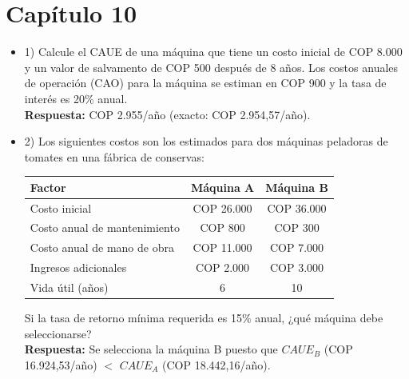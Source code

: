 

\chapter*{Capítulo 10}

\begin{itemize}

 \item 1) Calcule el CAUE de una máquina que tiene un costo inicial de COP 8.000 y un valor de salvamento de COP 500 después de 8 años. Los costos anuales de operación (CAO) para la máquina se estiman en COP 900 y la tasa de interés es 20\% anual.\\
       \textbf{Respuesta:} COP 2.955/año (exacto: COP 2.954,57/año).
       \medskip

 \item 2) Los siguientes costos son los estimados para dos máquinas peladoras de tomates en una fábrica de conservas:

       \begin{center}
        \renewcommand{\arraystretch}{1.2}
        \begin{tabular}{|l|c|c|}
         \hline
         \rowcolor[HTML]{FFB183}
         \textbf{Factor} & \textbf{Máquina A} & \textbf{Máquina B} \\ \hline
         Costo inicial                & COP 26.000         & COP 36.000         \\ \hline
         Costo anual de mantenimiento & COP 800            & COP 300            \\ \hline
         Costo anual de mano de obra  & COP 11.000         & COP 7.000          \\ \hline
         Ingresos adicionales         & COP 2.000          & COP 3.000          \\ \hline
         Vida útil (años)             & 6                  & 10                 \\ \hline
        \end{tabular}
       \end{center}

       Si la tasa de retorno mínima requerida es 15\% anual, ¿qué máquina debe seleccionarse?\\
       \textbf{Respuesta:} Se selecciona la máquina B puesto que $CAUE_B$ (COP 16.924,53/año) $<$ $CAUE_A$ (COP 18.442,16/año).
       \medskip


\end{itemize}
